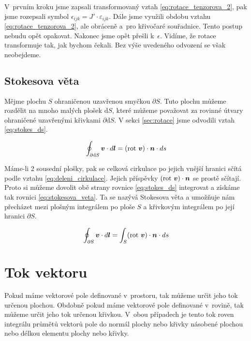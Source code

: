 V~prvním kroku jsme zapsali transformovaný vztah \eqref{eq:rotace_tenzorova_2}, pak jsme rozepsali symbol \(\epsilon_{ijk} = J' \cdot \varepsilon_{ijk}\). Dále jsme využili obdobu vztahu \eqref{eq:rotace_tenzorova_2}, ale obráceně a~pro křivočaré souřadnice. Tento postup nebudu opět opakovat. Nakonec jsme opět přešli k~\(\epsilon\). Vidíme, že rotace transformuje tak, jak bychom čekali. Bez výše uvedeného odvození se však neobejdeme.


\subsection{Stokesova věta}

Mějme plochu \(S\) ohraničenou uzavřenou smyčkou \(\partial S\). Tuto plochu můžeme rozdělit na mnoho malých plošek \(\mathrm{d}S\), které můžeme považovat za rovinné útvary ohraničené uzavřenými křivkami \(\partial \mathrm{d}S\). V sekci \ref{sec:rotace} jsme odvodili vztah \eqref{eq:stokes_ds}.

\begin{equation}
\label{eq:stokes_ds}
\oint_{\partial \mathrm{d}S} \vect{v} \cdot d\vect{l} = (\rot \ \vect{v}) \cdot \vect{n} \cdot ds
\end{equation}

Máme-li 2 sousední plošky, pak se celková cirkulace po jejich vnější hranici sčítá podle vztahu \eqref{eq:deleni_cirkulace}. Jejich příspěvky \((\mathrm{rot} \ \boldsymbol{v}) \cdot \boldsymbol{n}\) se prostě sčítají. Proto si můžeme dovolit obě strany rovnice \eqref{eq:stokes_ds} integrovat a získáme tak rovnici \eqref{eq:stokesova_veta}. Ta se nazývá Stokesova věta a umožňuje nám přecházet mezi plošným integrálem po ploše \(S\) a křivkovým integrálem po její hranici \(\partial S\).

\begin{equation}
\label{eq:stokesova_veta}
\oint_{\partial S} \boldsymbol{v} \cdot d\boldsymbol{l} = \int_S (\mathrm{rot} \ \boldsymbol{v}) \cdot \boldsymbol{n} \cdot ds
\end{equation}


\section{Tok vektoru}

Pokud máme vektorové pole definované v~prostoru, tak můžeme určit jeho tok určenou plochou. Obdobně pokud máme vektorové pole definované
 v~rovině, tak můžeme určit jeho tok určenou křivkou. V~obou případech je tento tok roven integrálu průmětů vektorů pole do normál plochy nebo křivky násobené plochou nebo délkou elementu plochy nebo křivky.
 
